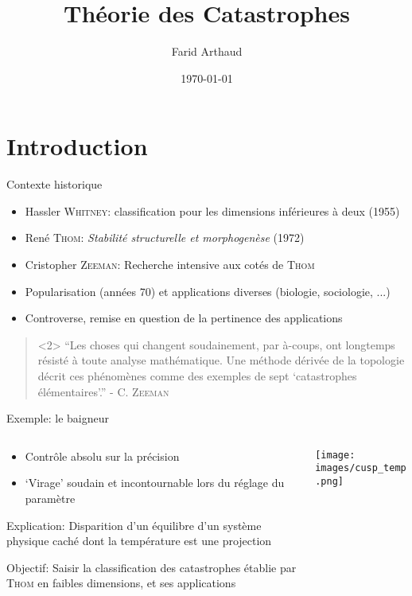\documentclass[compress]{beamer}
\author{Farid Arthaud}
\title{Théorie des Catastrophes}
\date{\today}
\theoremstyle{definition}
\begin{document}
\section*{Introduction}

\frame{\titlepage}

\frame{\tableofcontents}

\begin{frame}{Contexte historique}
    \begin{itemize}
        \item Hassler \textsc{Whitney}: classification pour les dimensions inférieures à deux (1955)
        \item René \textsc{Thom}: \textit{Stabilité structurelle et morphogenèse} (1972)
        \item Cristopher \textsc{Zeeman}: Recherche intensive aux cotés de \textsc{Thom}
        \item Popularisation (années 70) et applications diverses (biologie, sociologie, ...)
        \item Controverse, remise en question de la pertinence des applications
    \end{itemize}
    \begin{quote}<2>
        ``Les choses qui changent soudainement, par à-coups, ont longtemps résisté à toute analyse mathématique.
        Une méthode dérivée de la topologie décrit ces phénomènes comme des exemples de sept `catastrophes élémentaires'.'' - C. \textsc{Zeeman}
    \end{quote}
\end{frame}

\begin{frame}{Exemple: le baigneur}
    \begin{columns}[T]
        \begin{column}{5cm}
            \begin{itemize}[<+->]
                \item Contrôle absolu sur la précision
                \item `Virage' soudain et incontournable lors du réglage du paramètre
            \end{itemize}

            \pause[3]
            \alert{Explication}: Disparition d'un équilibre d'un système physique caché dont la température est une projection

            \pause[4]
            \alert{Objectif}: Saisir la classification des catastrophes établie par \textsc{Thom} en faibles dimensions, et ses applications
        \end{column}
        \begin{column}{5cm}
            \texttt{[image: images/cusp\_temp.png]}
        \end{column}
    \end{columns}
\end{frame}
\end{document}
